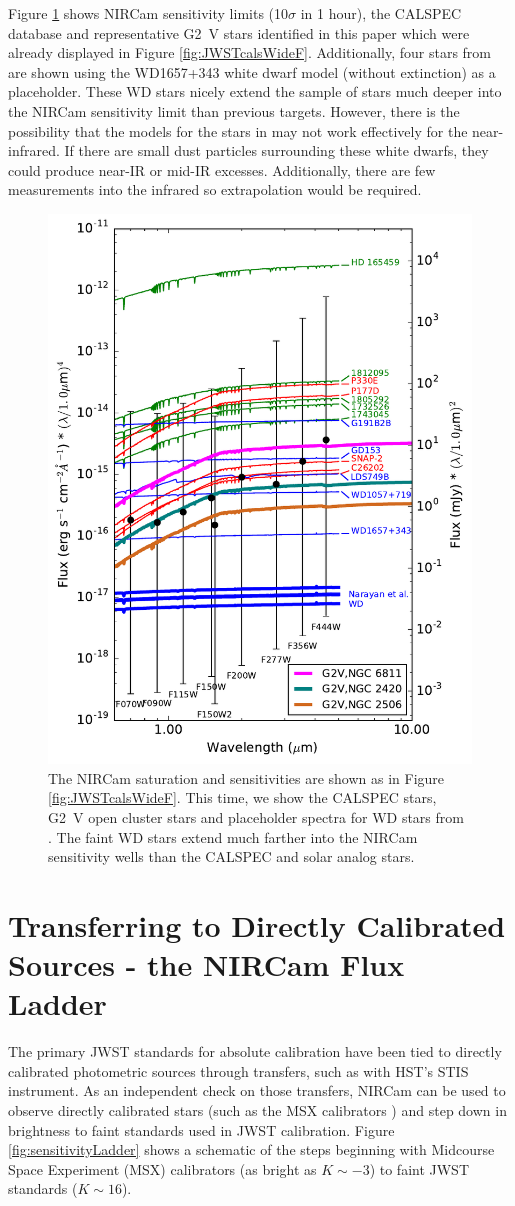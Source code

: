 \documentclass{aastex6}
\begin{document}
Figure \ref{fig:wideFiltWDCalspec} shows NIRCam sensitivity limits (10$\sigma$ in 1 hour), the CALSPEC database and representative G2~V stars identified in this paper which were already displayed in Figure \ref{fig:JWSTcalsWideF}.
Additionally, four stars from \citet{narayan2016wdnetwork} are shown using the WD1657+343 white dwarf model (without extinction) as a placeholder.
These WD stars nicely extend the sample of stars much deeper into the NIRCam sensitivity limit than previous targets.
However, there is the possibility that the models for the stars in \citet{narayan2016wdnetwork} may not work effectively for the near-infrared.
If there are small dust particles surrounding these white dwarfs, they could produce near-IR or mid-IR excesses.
Additionally, there are few measurements into the infrared so extrapolation would be required.

\begin{figure}[!hbtp]
\centering
\includegraphics[width=.49\columnwidth]{calspec_and_new_clust_wd.pdf}
\caption{The NIRCam saturation and sensitivities are shown as in Figure \ref{fig:JWSTcalsWideF}.
This time, we show the CALSPEC stars, G2~V open cluster stars and placeholder spectra for WD stars from \citet{narayan2016wdnetwork}.
The faint WD stars extend much farther into the NIRCam sensitivity wells than the CALSPEC and solar analog stars.}\label{fig:wideFiltWDCalspec}
\end{figure}


\clearpage
\section{Transferring to Directly Calibrated Sources - the NIRCam Flux Ladder}

The primary JWST standards for absolute calibration have been tied to directly calibrated photometric sources through transfers, such as with HST's STIS instrument.
As an independent check on those transfers, NIRCam can be used to observe directly calibrated stars (such as the MSX calibrators \citep{price2004msxCal}) and step down in brightness to faint standards used in JWST calibration.
Figure \ref{fig:sensitivityLadder} shows a schematic of the steps beginning with Midcourse Space Experiment (MSX) calibrators (as bright as $K \sim -3$) to faint JWST standards ($K \sim 16$).
\end{document}

